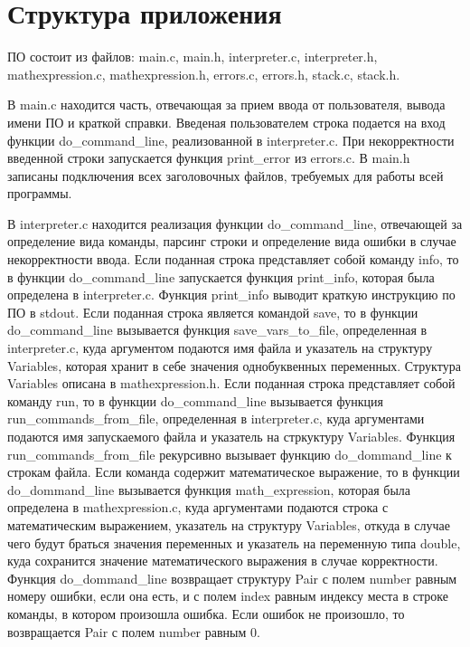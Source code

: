 \documentclass[a4paper,14pt]{extarticle}
\begin{document}
\newpage
\section{Структура приложения}
ПО состоит из файлов: main.c, main.h, interpreter.c, interpreter.h, mathexpression.c, mathexpression.h, errors.c, errors.h, stack.c,  stack.h. 

В main.c находится часть, отвечающая за прием ввода от пользователя, вывода имени ПО и краткой справки. Введеная пользователем строка подается на вход функции do\_command\_line, реализованной в interpreter.c. При некорректности введенной строки запускается функция print\_error из errors.c. В main.h записаны подключения всех заголовочных файлов, требуемых для работы всей программы. 

В interpreter.c находится реализация функции do\_command\_line, отвечающей за определение вида команды, парсинг строки и определение вида ошибки в случае некорректности ввода. Если поданная строка представляет собой команду info, то в функции do\_command\_line запускается функция print\_info, которая была определена в interpreter.c. Функция print\_info выводит краткую инструкцию по ПО в stdout. Если поданная строка является командой save, то в функции do\_command\_line вызывается функция save\_vars\_to\_file, определенная в interpreter.c, куда аргументом подаются имя файла и указатель на структуру Variables, которая хранит в себе значения однобуквенных переменных. Структура Variables описана в mathexpression.h. Если поданная строка представляет собой команду run, то в функции do\_command\_line вызывается функция run\_commands\_from\_file, определенная в interpreter.c, куда аргументами подаются имя запускаемого файла и указатель на стркуктуру Variables. Функция run\_commands\_from\_file рекурсивно вызывает функцию do\_dommand\_line к строкам файла. Если команда содержит математическое выражение, то в функции do\_dommand\_line вызывается функция math\_expression, которая была определена в mathexpression.c, куда аргументами подаются строка с математическим выражением, указатель на структуру Variables, откуда в случае чего будут браться значения переменных и указатель на переменную типа double, куда сохранится значение математического выражения в случае корректности. Функция do\_dommand\_line возвращает структуру Pair с полем number равным номеру ошибки, если она есть, и с полем index равным индексу места в строке команды, в котором произошла ошибка. Если ошибок не произошло, то возвращается Pair с полем number равным 0. 
\end{document}
